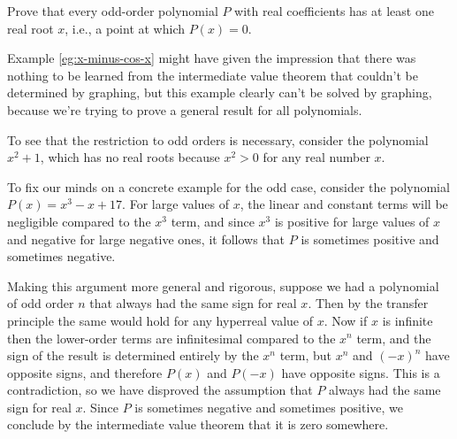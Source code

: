 


\begin{eg}
\egquestion Prove that every odd-order polynomial $P$ with real coefficients has at least one real root $x$, i.e., a
point at which $P(x)=0$.

\eganswer
Example \ref{eg:x-minus-cos-x} might have given the impression that there was nothing
to be learned from the intermediate value theorem that couldn't be determined by graphing,
but this example clearly can't be solved by graphing, because we're trying to prove
a general result for all polynomials.

To see that the restriction to odd orders is necessary, consider the polynomial $x^2+1$, which has no real roots
because $x^2>0$ for any real number $x$.

To fix our minds on a concrete example for the odd case, consider the polynomial $P(x)=x^3-x+17$.
For large values of $x$, the linear and constant terms will be negligible compared to the $x^3$ term,
and since $x^3$ is positive for large values of $x$ and negative for large negative ones, it follows
that $P$ is sometimes positive and sometimes negative.

Making this argument more general and rigorous,
suppose we had a polynomial of odd order $n$ that always had the same sign for real $x$. Then by the transfer principle
the same would hold for any hyperreal value of $x$. Now if $x$ is infinite then the lower-order terms
are infinitesimal compared to the $x^n$ term, and the sign of the result is determined entirely by the
$x^n$ term, but $x^n$ and $(-x)^n$ have opposite signs, and therefore $P(x)$ and $P(-x)$ have opposite signs.
This is a contradiction, so we have disproved the assumption that $P$ always had the same sign for real $x$.
Since $P$ is sometimes negative and sometimes positive, we conclude by the intermediate value theorem that
it is zero somewhere.
\end{eg}

